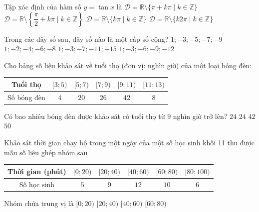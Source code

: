\begin{ex}%
	Tập xác định của hàm số $y=\tan x$ là
	\choice
	{$\mathscr{D}=\mathbb{R} \setminus\{\pi+k \pi \mid k \in \mathbb{Z}\}$}
	{\True $\mathscr{D}=\mathbb{R} \setminus\left\{\dfrac{\pi}{2}+k \pi \mid k \in \mathbb{Z}\right\}$}
	{$\mathscr{D}=\mathbb{R} \setminus\{k \pi \mid k \in \mathbb{Z}\}$}
	{$\mathscr{D}=\mathbb{R} \setminus\{k 2\pi \mid k \in \mathbb{Z}\}$}
\end{ex}

\begin{ex}%
Trong các dãy số sau, dãy số nào là một cấp số cộng?
\choice
{$ 1;-3;-5;-7;-9$}
{$ 1;-2;-4;-6;-8$}
{\True $ 1;-3;-7;-11;-15$}
{$ 1;-3;-6;-9;-12$}
\end{ex}

\begin{ex}%
Cho bảng số liệu khảo sát về tuổi thọ (đơn vị: nghìn giờ) của một loại bóng đèn:
\begin{longtable}{|c|c|c|c|c|c|}
\hline Tuổi thọ &{$[3 ; 5)$}&{$[5 ; 7)$}&{$[7 ; 9)$}&{$[9 ; 11)$}&{$[11 ; 13)$}\\
\hline Số bóng đèn & $4$ & $20$ & $26$ & $42$ & $8$ \\
\hline
\end{longtable}
Có bao nhiêu bóng đèn được khảo sát có tuổi thọ từ $9$ nghìn giờ trở lên?
\choice
{$24$}
{$24$}
{$42$}
{\True $50$}
\end{ex}

\begin{ex}%
Khảo sát thời gian chạy bộ trong một ngày của một số học sinh khối 11 thu được mẫu số liệu ghép nhóm sau
\begin{center}
\begin{tabular}{|c|c|c|c|c|c|}
\hline
Thời gian (phút) & $[0 ; 20)$ & $[20 ; 40)$ & $[40 ; 60)$ & $[60 ; 80)$ & $[80 ; 100)$ \\
\hline
Số học sinh & $5$ & $9$ & $12$ & $10$ & $6$ \\
\hline
\end{tabular}
\end{center}
Nhóm chứa trung vị là
\choice
{$[0 ; 20)$}
{$[20 ; 40)$}
{\True $[40 ; 60)$}
{$[60 ; 80)$}
\loigiai{
$\dfrac{n}{2}=\dfrac{42}{2}=21$; $5+9+12=26$.\\
Nhóm chứa trung vị $[40 ; 60)$.
}
\end{ex}

